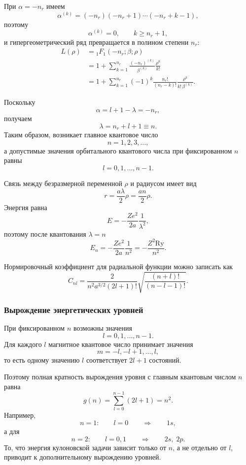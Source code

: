 \documentclass[12pt,a4paper]{article}
\begin{document}
При $\alpha=-n_r$ имеем
\[
    \alpha^{(k)}
    =
    (-n_r)(-n_r+1)\cdots(-n_r+k-1),
\]
поэтому
\[
    \alpha^{(k)}=0,
    \qquad
    k\geq n_r+1,
\]
и гипергеометрический ряд превращается в полином степени $n_r$:
\[
\begin{aligned}
    L(\rho)
    &=
    {}_1F_1(-n_r;\beta;\rho) \\
    &=
    1+
    \sum_{k=1}^{n_r}
    \frac{(-n_r)^{(k)}}{\beta^{(k)}}
    \frac{\rho^k}{k!} \\
    &=
    1+
    \sum_{k=1}^{n_r}
    (-1)^k
    \frac{n_r!}{(n_r-k)!}
    \frac{\rho^k}{k!\,\beta^{(k)}}.
\end{aligned}
\]

Поскольку
\[
    \alpha=l+1-\lambda=-n_r,
\]
получаем
\[
    \boxed{
        \lambda=n_r+l+1\equiv n
    }.
\]
Таким образом, возникает главное квантовое число
\[
    \boxed{
        n=1,2,3,\ldots
    },
\]
а допустимые значения орбитального квантового числа при фиксированном
$n$ равны
\[
    \boxed{
        l=0,1,\ldots,n-1
    }.
\]

Связь между безразмерной переменной $\rho$ и радиусом имеет вид
\[
    r=\frac{a\lambda}{2}\rho
    =
    \frac{an}{2}\rho.
\]
Энергия равна
\[
    E
    =
    -\frac{Ze^2}{2a}\frac{1}{\lambda^2},
\]
поэтому после квантования $\lambda=n$
\[
    \boxed{
        E_n
        =
        -\frac{Ze^2}{2a}\frac{1}{n^2}
        =
        -\frac{Z^2\mathrm{Ry}}{n^2}
    }.
\]

Нормировочный коэффициент для радиальной функции можно записать как
\[
    \boxed{
    C_{nl}
    =
    \frac{2}
         {n^2a^{3/2}(2l+1)!}
    \sqrt{
        \frac{(n+l)!}{(n-l-1)!}
    }
    }.
\]

\subsubsection{Вырождение энергетических уровней}

При фиксированном $n$ возможны значения
\[
    l=0,1,\ldots,n-1.
\]
Для каждого $l$ магнитное квантовое число принимает значения
\[
    m=-l,-l+1,\ldots,l,
\]
то есть одному значению $l$ соответствует $2l+1$ состояний.

Поэтому полная кратность вырождения уровня с главным квантовым числом
$n$ равна
\[
    \boxed{
    g(n)
    =
    \sum_{l=0}^{n-1}(2l+1)
    =
    n^2
    }.
\]
Например,
\[
    n=1:
    \qquad
    l=0
    \qquad
    \Rightarrow
    \qquad
    1s,
\]
а для
\[
    n=2:
    \qquad
    l=0,1
    \qquad
    \Rightarrow
    \qquad
    2s,\;2p.
\]
То, что энергия кулоновской задачи зависит только от $n$, а не отдельно
от $l$, приводит к дополнительному вырождению уровней.
\end{document}
